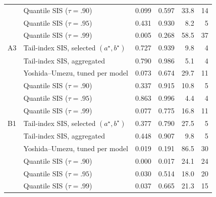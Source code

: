 \begin{table}[t]
\begin{tabular}{llrrrr}
 & Quantile SIS ($\tau=.90$) & 0.099 & 0.597 & 33.8 & 14\\
 & Quantile SIS ($\tau=.95$) & 0.431 & 0.930 & 8.2 & 5\\
 & Quantile SIS ($\tau=.99$) & 0.005 & 0.268 & 58.5 & 37\\
\addlinespace
A3 & Tail-index SIS, selected $(a^\star,b^\star)$ & 0.727 & 0.939 & 9.8 & 4\\
 & Tail-index SIS, aggregated & 0.790 & 0.986 & 5.1 & 4\\
 & Yoshida--Umezu, tuned per model & 0.073 & 0.674 & 29.7 & 11\\
 & Quantile SIS ($\tau=.90$) & 0.337 & 0.915 & 10.8 & 5\\
 & Quantile SIS ($\tau=.95$) & 0.863 & 0.996 & 4.4 & 4\\
 & Quantile SIS ($\tau=.99$) & 0.077 & 0.775 & 16.8 & 11\\
\addlinespace
B1 & Tail-index SIS, selected $(a^\star,b^\star)$ & 0.377 & 0.790 & 27.5 & 5\\
 & Tail-index SIS, aggregated & 0.448 & 0.907 & 9.8 & 5\\
 & Yoshida--Umezu, tuned per model & 0.019 & 0.191 & 86.5 & 30\\
 & Quantile SIS ($\tau=.90$) & 0.000 & 0.017 & 24.1 & 24\\
 & Quantile SIS ($\tau=.95$) & 0.030 & 0.514 & 18.0 & 20\\
 & Quantile SIS ($\tau=.99$) & 0.037 & 0.665 & 21.3 & 15\\
\bottomrule
\end{tabular}
\end{table}
